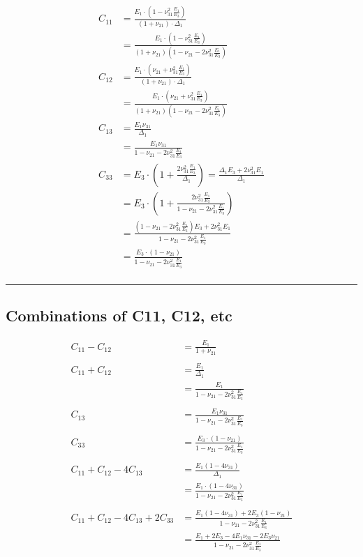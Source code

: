 \documentclass{article}
\begin{document}
\begin{align}
C_{11}
&=\frac{E_1 \cdot \left( 1-\nu_{31}^2 \frac{E_1}{E_3} \right)}{ \left(1+\nu_{21}\right) \cdot \Delta_1} \\
&=\frac{E_1 \cdot \left( 1-\nu_{31}^2 \frac{E_1}{E_3} \right)}{ \left(1+\nu_{21}\right) \left( 1-\nu_{21}-2\nu_{31}^2\frac{E_1}{E_3} \right) } \\
C_{12}
&=\frac{E_1 \cdot \left( \nu_{21}+\nu_{31}^2 \frac{E_1}{E_3} \right)}{ \left(1+\nu_{21}\right) \cdot \Delta_1} \\
&=\frac{E_1 \cdot \left( \nu_{21}+\nu_{31}^2 \frac{E_1}{E_3} \right)}{ \left(1+\nu_{21}\right)  \left( 1-\nu_{21}-2\nu_{31}^2\frac{E_1}{E_3} \right) } \\
C_{13}
&=\frac{E_1 \nu_{31}}{ \Delta_1} \\
&=\frac{E_1 \nu_{31}}{ 1-\nu_{21}-2\nu_{31}^2\frac{E_1}{E_3} } \\
C_{33}
&=E_3 \cdot \left( 1 + \frac{  2\nu_{31}^2 \frac{E_1}{E_3}}{\Delta_1} \right)
= \frac{ \Delta_1 E_3 + 2\nu_{31}^2 E_1}{\Delta_1} \\
&=E_3 \cdot \left( 1 + \frac{  2\nu_{31}^2 \frac{E_1}{E_3}}{ 1-\nu_{21}-2\nu_{31}^2\frac{E_1}{E_3} } \right) \\
&= \frac{ \left( 1-\nu_{21}-2\nu_{31}^2\frac{E_1}{E_3} \right) E_3 + 2 \nu_{31}^2 E_1}{ 1-\nu_{21}-2\nu_{31}^2\frac{E_1}{E_3} }  \\
&= \frac{ E_3 \cdot \left( 1-\nu_{21} \right) }{ 1-\nu_{21}-2\nu_{31}^2\frac{E_1}{E_3} }  \\
\end{align}
\noindent\rule{8cm}{0.4pt}

\subsection{Combinations of C11, C12, etc}
\begin{align}
C_{11}-C_{12}
&=\frac{E_1}{1+\nu_{21}} \\
\\
C_{11}+C_{12}
&=\frac{E_1}{\Delta_1} \\
&=\frac{E_1}{ 1-\nu_{21}-2\nu_{31}^2\frac{E_1}{E_3} } \\
\\
C_{13} 
&= \frac{E_1 \nu_{31}}{ 1-\nu_{21}-2\nu_{31}^2\frac{E_1}{E_3} }  \\
\\
C_{33} 
&= \frac{ E_3 \cdot \left( 1-\nu_{21} \right) }{ 1-\nu_{21}-2\nu_{31}^2\frac{E_1}{E_3} }  \\
\\
C_{11}+C_{12}-4C_{13} 
&= \frac{E_1 \left(1-4\nu_{31} \right)}{\Delta_1}  \\
&= \frac{E_1 \cdot \left(1-4\nu_{31} \right)}{ 1-\nu_{21}-2\nu_{31}^2\frac{E_1}{E_3} }  \\
\\
C_{11}+C_{12}-4C_{13}+2C_{33} 
&= \frac{E_1 \left(1-4\nu_{31} \right) + 2 E_3 \left( 1-\nu_{21} \right) }{ 1-\nu_{21}-2\nu_{31}^2\frac{E_1}{E_3} }  \\
&= \frac{E_1+2E_3 -4 E_1 \nu_{31} - 2E_3 \nu_{21} }{ 1-\nu_{21}-2\nu_{31}^2\frac{E_1}{E_3} }  \\
\end{align}
\end{document}
